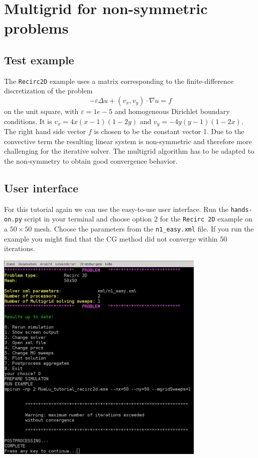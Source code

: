 \documentclass[10pt,fleqn]{book}
\begin{document}
\chapter{Multigrid for non-symmetric problems}

\section{Test example}
\label{sec:recircexample}
The \texttt{Recirc2D} example uses a matrix corresponding to the finite-difference discretization of the problem
\begin{displaymath}
-\varepsilon\Delta u + (v_x,v_y)\cdot \nabla u=f
\end{displaymath}
on the unit square, with $\varepsilon=1e-5$ and homogeneous Dirichlet boundary conditions. It is $v_x=4x(x-1)(1-2y)$ and $v_y=-4y(y-1)(1-2x)$.
The right hand side vector $f$ is chosen to be the constant vector 1. Due to the convective term the resulting linear system is non-symmetric and therefore more challenging for the iterative solver. The multigrid algorithm has to be adapted to the non-symmetry to obtain good convergence behavior.

\section{User interface}

For this tutorial again we can use the easy-to-use user interface. Run the \texttt{hands-on.py} script in your terminal and choose option 2 for the \texttt{Recirc 2D} example on a $50\times 50$ mesh.
Choose the parameters from the \texttt{n1\_easy.xml} file. If you run the example you might find that the CG method did not converge within 50 iterations.
\begin{center}\includegraphics[width=10cm]{pics/tut1_13.png} \end{center}
\end{document}
